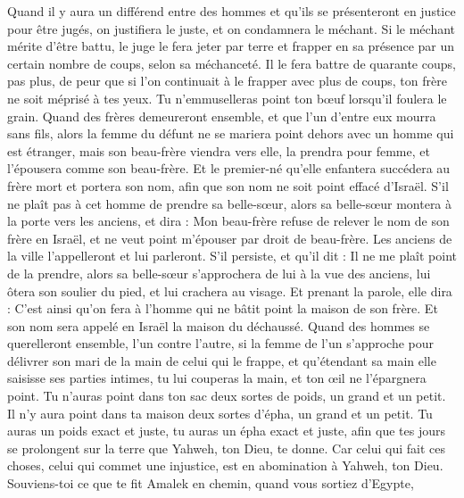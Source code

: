 \begin{multicols}{2}
\VerseOne{}Quand il y aura un différend entre des hommes et qu'ils se présenteront en justice pour être jugés, on justifiera le juste, et on condamnera le méchant.
Si le méchant mérite d'être battu, le juge le fera jeter par terre et frapper en sa présence par un certain nombre de coups, selon sa méchanceté.
Il le fera battre de quarante coups, pas plus, de peur que si l'on continuait à le frapper avec plus de coups, ton frère ne soit méprisé à tes yeux.
Tu n'emmuselleras point ton bœuf lorsqu'il foulera le grain.
Quand des frères demeureront ensemble, et que l'un d'entre eux mourra sans fils, alors la femme du défunt ne se mariera point dehors avec un homme qui est étranger, mais son beau-frère viendra vers elle, la prendra pour femme, et l'épousera comme son beau-frère.
Et le premier-né qu'elle enfantera succédera au frère mort et portera son nom, afin que son nom ne soit point effacé d'Israël.
S'il ne plaît pas à cet homme de prendre sa belle-sœur, alors sa belle-sœur montera à la porte vers les anciens, et dira : Mon beau-frère refuse de relever le nom de son frère en Israël, et ne veut point m'épouser par droit de beau-frère.
Les anciens de la ville l'appelleront et lui parleront. S'il persiste, et qu'il dit : Il ne me plaît point de la prendre,
alors sa belle-sœur s'approchera de lui à la vue des anciens, lui ôtera son soulier du pied, et lui crachera au visage. Et prenant la parole, elle dira : C'est ainsi qu'on fera à l'homme qui ne bâtit point la maison de son frère.
Et son nom sera appelé en Israël la maison du déchaussé.
Quand des hommes se querelleront ensemble, l'un contre l'autre, si la femme de l'un s'approche pour délivrer son mari de la main de celui qui le frappe, et qu'étendant sa main elle saisisse ses parties intimes,
tu lui couperas la main, et ton œil ne l'épargnera point.
Tu n'auras point dans ton sac deux sortes de poids, un grand et un petit.
Il n'y aura point dans ta maison deux sortes d'épha, un grand et un petit.
Tu auras un poids exact et juste, tu auras un épha exact et juste, afin que tes jours se prolongent sur la terre que Yahweh, ton Dieu, te donne.
Car celui qui fait ces choses, celui qui commet une injustice, est en abomination à Yahweh, ton Dieu.
Souviens-toi ce que te fit Amalek en chemin, quand vous sortiez d'Egypte,

\end{multicols}
